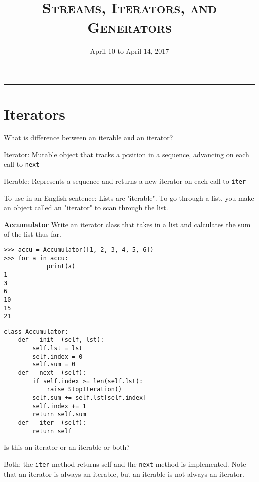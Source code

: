 \documentclass{exam}
\title{\textsc{Streams, Iterators, and Generators}}
\date{April 10 to April 14, 2017}
\begin{document}
\maketitle
\rule{\textwidth}{0.15em}
\fontsize{12}{15}\selectfont


\section{Iterators}
\begin{questions}
\begin{blocksection}
\question What is difference between an iterable and an iterator?
\begin{solution}[0.5in]
Iterator: Mutable object that tracks a position in a sequence, advancing on each call to \texttt{next} 

Iterable: Represents a sequence and returns a new iterator on each call to \texttt{iter}

To use in an English sentence:
Lists are "iterable". To go through a list, you make an object called an "iterator" to scan through the list.
\end{solution}
\end{blocksection}

\begin{blocksection}
\question \textbf{Accumulator} Write an iterator class that takes in a list and calculates the sum of the list thus far.
\begin{lstlisting}
>>> accu = Accumulator([1, 2, 3, 4, 5, 6])
>>> for a in accu:
            print(a)
1
3
6
10
15
21
\end{lstlisting}

\begin{solution}[1.5in]
\begin{lstlisting}
class Accumulator:
	def __init__(self, lst):
		self.lst = lst
		self.index = 0
		self.sum = 0
	def __next__(self):
		if self.index >= len(self.lst):
			raise StopIteration()
		self.sum += self.lst[self.index]
		self.index += 1
		return self.sum
	def __iter__(self):
		return self
\end{lstlisting}
\end{solution}
\end{blocksection}

\begin{blocksection}
\question Is this an iterator or an iterable or both?
\begin{solution}[0.5in]
Both; the \texttt{iter} method returns self and the \texttt{next} method is implemented. Note that an iterator is always an iterable, but an iterable is not always an iterator.
\end{solution}


\end{blocksection}
\end{questions}
\end{document}
